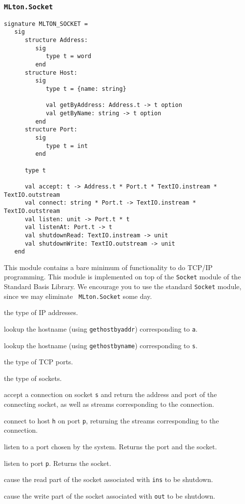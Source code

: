 \subsubsection{{\tt MLton.Socket}}

\begin{verbatim}
signature MLTON_SOCKET =
   sig
      structure Address:
         sig
            type t = word
         end
      structure Host:
         sig
            type t = {name: string}

            val getByAddress: Address.t -> t option
            val getByName: string -> t option
         end
      structure Port:
         sig
            type t = int
         end

      type t

      val accept: t -> Address.t * Port.t * TextIO.instream * TextIO.outstream
      val connect: string * Port.t -> TextIO.instream * TextIO.outstream
      val listen: unit -> Port.t * t
      val listenAt: Port.t -> t
      val shutdownRead: TextIO.instream -> unit
      val shutdownWrite: TextIO.outstream -> unit
   end
\end{verbatim}

This module contains a bare minimum of functionality to do TCP/IP
programming.  This module is implemented on top of the {\tt Socket}
module of the Standard Basis Library.  We encourage you to use the
standard {\tt Socket} module, since we may eliminate {\tt
MLton.Socket} some day.

\begin{description}

the type of IP addresses.

lookup the hostname (using {\tt gethostbyaddr}) corresponding to {\tt a}.

lookup the hostname (using {\tt gethostbyname}) corresponding to {\tt s}.

the type of TCP ports.

the type of sockets.

accept a connection on socket {\tt s} and return the address and
port of the connecting socket, as well as streams corresponding to the
connection.

connect to host {\tt h} on port {\tt p}, returning the streams
corresponding to the connection.

listen to a port chosen by the system.  Returns the port and the socket.

listen to port {\tt p}.  Returns the socket.

cause the read part of the socket associated with {\tt ins} to be shutdown.

cause the write part of the socket associated with {\tt out} to be shutdown.
\end{description}
%
